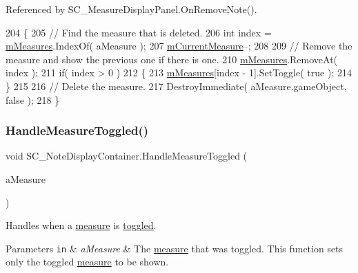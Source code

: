 Referenced by S\+C\+\_\+\+Measure\+Display\+Panel.\+On\+Remove\+Note().


\begin{DoxyCode}
204     \{
205         \textcolor{comment}{// Find the measure that is deleted.}
206         \textcolor{keywordtype}{int} index = \hyperlink{group___s_c___n_d_c_priv_var_gaa072fb53f6bd6646bc85f2ebc2a02229}{mMeasures}.IndexOf( aMeasure );
207         \hyperlink{group___s_c___n_d_c_priv_var_ga28ce2bf8358c9f686b5b9e362aa96dff}{mCurrentMeasure}--;
208 
209         \textcolor{comment}{// Remove the measure and show the previous one if there is one. }
210         \hyperlink{group___s_c___n_d_c_priv_var_gaa072fb53f6bd6646bc85f2ebc2a02229}{mMeasures}.RemoveAt( index );
211         \textcolor{keywordflow}{if}( index > 0 )
212         \{
213             \hyperlink{group___s_c___n_d_c_priv_var_gaa072fb53f6bd6646bc85f2ebc2a02229}{mMeasures}[index - 1].SetToggle( \textcolor{keyword}{true} );
214         \}
215 
216         \textcolor{comment}{// Delete the measure.}
217         DestroyImmediate( aMeasure.gameObject, \textcolor{keyword}{false} );
218     \}
\end{DoxyCode}
\mbox{\label{group___s_c___n_d_c_handlers_ga458d57203645be514d3626211044b584}} 
\subsubsection{\texorpdfstring{Handle\+Measure\+Toggled()}{HandleMeasureToggled()}}
{\footnotesize\ttfamily void S\+C\+\_\+\+Note\+Display\+Container.\+Handle\+Measure\+Toggled (\begin{DoxyParamCaption}\item[{\hyperlink{class_s_c___measure_display_panel}{S\+C\+\_\+\+Measure\+Display\+Panel}}]{a\+Measure }\end{DoxyParamCaption})}



Handles when a \hyperlink{group___doc_s_c___m_d_p}{measure} is \hyperlink{group___s_c___m_d_p_handlers_ga31c72fee5ddd5ae7b057b2f265341263}{toggled}. 


\begin{DoxyParams}[1]{Parameters}
\mbox{\tt in}  & {\em a\+Measure} & The \hyperlink{group___doc_s_c___m_d_p}{measure} that was toggled. This function sets only the toggled \hyperlink{group___doc_s_c___m_d_p}{measure} to be shown. \\
\hline
\end{DoxyParams}


